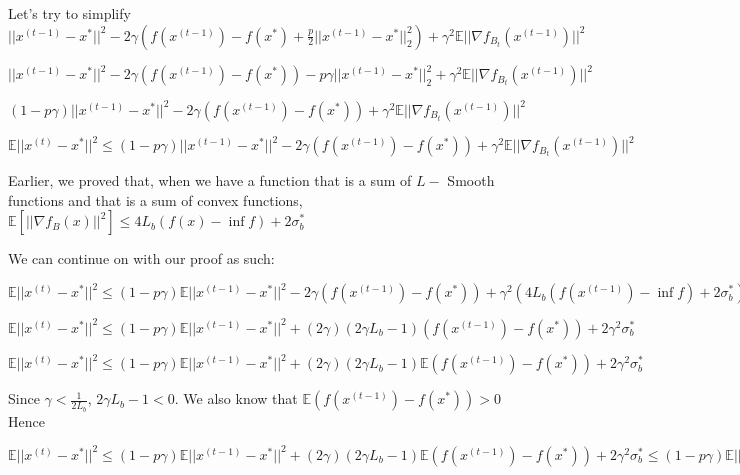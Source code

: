 Let's try to simplify $||x^{(t - 1)} - x^*||^2 - 2\gamma (f(x^{(t - 1)}) - f(x^*) + \frac{p}{2} ||x^{(t - 1)} - x^*||^2_2) + \gamma^2 \mathbb{E} ||\nabla f_{B_t}(x^{(t - 1)})||^2$ \newline 

$||x^{(t - 1)} - x^*||^2 - 2\gamma (f(x^{(t - 1)}) - f(x^*)) - p \gamma ||x^{(t - 1)} - x^*||^2_2 + \gamma^2 \mathbb{E} ||\nabla f_{B_t}(x^{(t - 1)})||^2$ \newline 


$(1 - p \gamma)||x^{(t - 1)} - x^*||^2 - 2\gamma (f(x^{(t - 1)}) - f(x^*))+ \gamma^2 \mathbb{E} ||\nabla f_{B_t}(x^{(t - 1)})||^2$ \newline 

$\mathbb{E}||x^{(t)} - x^*||^2  \leq (1 - p \gamma)||x^{(t - 1)} - x^*||^2 - 2\gamma (f(x^{(t - 1)}) - f(x^*))+ \gamma^2 \mathbb{E} ||\nabla f_{B_t}(x^{(t - 1)})||^2$ \newline 

Earlier, we proved that, when we have a function that is a sum of $L-$ Smooth functions and that is a sum of convex functions, $\mathbb{E}[||\nabla f_B(x)||^2] \leq 4L_{b} (f(x) - \inf f) + 2 \sigma_b^*$ \newline 

We can continue on with our proof as such: \newline 

$\mathbb{E}||x^{(t)} - x^*||^2  \leq (1 - p \gamma) \mathbb{E}||x^{(t - 1)} - x^*||^2 - 2\gamma(f(x^{(t - 1)}) - f(x^*)) + \gamma^2 (4L_{b} (f(x^{(t - 1)}) - \inf f) + 2 \sigma_b^*)$ \newline 

$\mathbb{E}||x^{(t)} - x^*||^2  \leq (1 - p \gamma) \mathbb{E}||x^{(t - 1)} - x^*||^2 + (2 \gamma) (2 \gamma L_{b} - 1)(f(x^{(t - 1)}) - f(x^*)) + 2\gamma^2 \sigma_b^*$ \newline 

$\mathbb{E}||x^{(t)} - x^*||^2  \leq (1 - p \gamma) \mathbb{E}||x^{(t - 1)} - x^*||^2 + (2 \gamma) (2 \gamma L_{b} - 1) \mathbb{E}(f(x^{(t - 1)}) - f(x^*)) + 2\gamma^2 \sigma_b^*$ \newline 

Since $\gamma < \frac{1}{2L_{b}}$, $2\gamma L_{b} - 1 < 0$. We also know that $\mathbb{E}(f(x^{(t - 1)}) - f(x^*)) > 0$ Hence \newline 

$\mathbb{E}||x^{(t)} - x^*||^2  \leq (1 - p \gamma) \mathbb{E}||x^{(t - 1)} - x^*||^2 + (2 \gamma) (2 \gamma L_{b} - 1) \mathbb{E}(f(x^{(t - 1)}) - f(x^*)) + 2\gamma^2 \sigma_b^* \leq (1 - p \gamma) \mathbb{E}||x^{(t - 1)} - x^*||^2 + 2\gamma^2 \sigma_b^*$ \newline 


